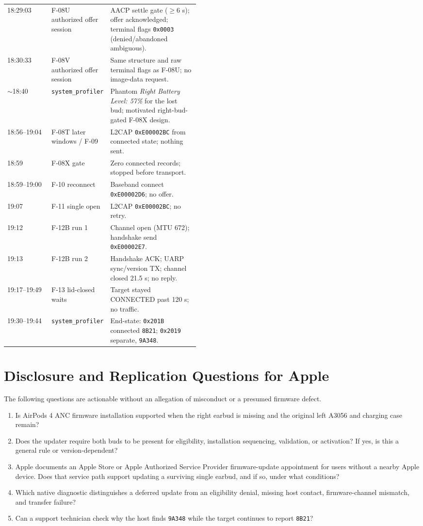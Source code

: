 \documentclass[11pt,letterpaper]{article}
\begin{document}
\begin{table}[H]
\begin{tabularx}{\linewidth}{@{}p{0.23\linewidth}p{0.23\linewidth}X@{}}
18:29:03 & F-08U authorized offer session & AACP settle gate ($\geq$6 s); offer acknowledged; terminal flags \texttt{0x0003} (denied/abandoned ambiguous). \\
18:30:33 & F-08V authorized offer session & Same structure and raw terminal flags as F-08U; no image-data request. \\
$\sim$18:40 & \texttt{system\_profiler} & Phantom \emph{Right Battery Level: 57\%} for the lost bud; motivated right-bud-gated F-08X design. \\
18:56--19:04 & F-08T later windows / F-09 & L2CAP \texttt{0xE00002BC} from connected state; nothing sent. \\
18:59 & F-08X gate & Zero connected records; stopped before transport. \\
18:59--19:00 & F-10 reconnect & Baseband connect \texttt{0xE00002D6}; no offer. \\
19:07 & F-11 single open & L2CAP \texttt{0xE00002BC}; no retry. \\
19:12 & F-12B run 1 & Channel open (MTU 672); handshake send \texttt{0xE00002E7}. \\
19:13 & F-12B run 2 & Handshake ACK; UARP sync/version TX; channel closed 21.5 s; no reply. \\
19:17--19:49 & F-13 lid-closed waits & Target stayed CONNECTED past 120 s; no traffic. \\
19:30--19:44 & \texttt{system\_profiler} & End-state: \texttt{0x201B} connected \texttt{8B21}; \texttt{0x2019} separate, \texttt{9A348}. \\
\bottomrule\end{tabularx}
\end{table}

\section{Disclosure and Replication Questions for Apple}\label{app:apple}
The following questions are actionable without an allegation of misconduct or a presumed firmware defect.
\begin{enumerate}[leftmargin=2em]
\item Is AirPods 4 ANC firmware installation supported when the right earbud is missing and the original left A3056 and charging case remain?
\item Does the updater require both buds to be present for eligibility, installation sequencing, validation, or activation? If yes, is this a general rule or version-dependent?
\item Apple documents an Apple Store or Apple Authorized Service Provider firmware-update appointment for users without a nearby Apple device. Does that service path support updating a surviving single earbud, and if so, under what conditions?
\item Which native diagnostic distinguishes a deferred update from an eligibility denial, missing host contact, firmware-channel mismatch, and transfer failure?
\item Can a support technician check why the host finds \texttt{9A348} while the target continues to report \texttt{8B21}?
\end{enumerate}
\end{document}
